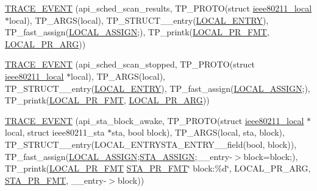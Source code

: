 \begin{DoxyCompactItemize}
\item 
\hyperlink{driver-trace_8h_a092d29134a8ac934242375c8f146a1ba}{T\-R\-A\-C\-E\-\_\-\-E\-V\-E\-N\-T} (api\-\_\-sched\-\_\-scan\-\_\-results, T\-P\-\_\-\-P\-R\-O\-T\-O(struct \hyperlink{structieee80211__local}{ieee80211\-\_\-local} $\ast$local), T\-P\-\_\-\-A\-R\-G\-S(local), T\-P\-\_\-\-S\-T\-R\-U\-C\-T\-\_\-\-\_\-entry(\hyperlink{driver-trace_8h_a70464a6fcf42a8540b6e5b4b5530437f}{L\-O\-C\-A\-L\-\_\-\-E\-N\-T\-R\-Y}), T\-P\-\_\-fast\-\_\-assign(\hyperlink{driver-trace_8h_ab19d9141887ea92ef9640df06a51e0a1}{L\-O\-C\-A\-L\-\_\-\-A\-S\-S\-I\-G\-N};), T\-P\-\_\-printk(\hyperlink{driver-trace_8h_a09833af423135e21ffe99a59ae088cf1}{L\-O\-C\-A\-L\-\_\-\-P\-R\-\_\-\-F\-M\-T}, \hyperlink{driver-trace_8h_aa2a77a17621ecb4f0b3926fec90a5538}{L\-O\-C\-A\-L\-\_\-\-P\-R\-\_\-\-A\-R\-G}))
\item 
\hyperlink{driver-trace_8h_aff2e748442cb64181b77000c86bd652f}{T\-R\-A\-C\-E\-\_\-\-E\-V\-E\-N\-T} (api\-\_\-sched\-\_\-scan\-\_\-stopped, T\-P\-\_\-\-P\-R\-O\-T\-O(struct \hyperlink{structieee80211__local}{ieee80211\-\_\-local} $\ast$local), T\-P\-\_\-\-A\-R\-G\-S(local), T\-P\-\_\-\-S\-T\-R\-U\-C\-T\-\_\-\-\_\-entry(\hyperlink{driver-trace_8h_a70464a6fcf42a8540b6e5b4b5530437f}{L\-O\-C\-A\-L\-\_\-\-E\-N\-T\-R\-Y}), T\-P\-\_\-fast\-\_\-assign(\hyperlink{driver-trace_8h_ab19d9141887ea92ef9640df06a51e0a1}{L\-O\-C\-A\-L\-\_\-\-A\-S\-S\-I\-G\-N};), T\-P\-\_\-printk(\hyperlink{driver-trace_8h_a09833af423135e21ffe99a59ae088cf1}{L\-O\-C\-A\-L\-\_\-\-P\-R\-\_\-\-F\-M\-T}, \hyperlink{driver-trace_8h_aa2a77a17621ecb4f0b3926fec90a5538}{L\-O\-C\-A\-L\-\_\-\-P\-R\-\_\-\-A\-R\-G}))
\item 
\hyperlink{driver-trace_8h_a63770dcb8f073c4d9df3979a925aadfe}{T\-R\-A\-C\-E\-\_\-\-E\-V\-E\-N\-T} (api\-\_\-sta\-\_\-block\-\_\-awake, T\-P\-\_\-\-P\-R\-O\-T\-O(struct \hyperlink{structieee80211__local}{ieee80211\-\_\-local} $\ast$local, struct ieee80211\-\_\-sta $\ast$sta, bool block), T\-P\-\_\-\-A\-R\-G\-S(local, sta, block), T\-P\-\_\-\-S\-T\-R\-U\-C\-T\-\_\-\-\_\-entry(L\-O\-C\-A\-L\-\_\-\-E\-N\-T\-R\-Y\-S\-T\-A\-\_\-\-E\-N\-T\-R\-Y\-\_\-\-\_\-field(bool, block)), T\-P\-\_\-fast\-\_\-assign(\hyperlink{driver-trace_8h_ab19d9141887ea92ef9640df06a51e0a1}{L\-O\-C\-A\-L\-\_\-\-A\-S\-S\-I\-G\-N};\hyperlink{driver-trace_8h_abbd837b5fc444c0cb48b5954f8ad068a}{S\-T\-A\-\_\-\-A\-S\-S\-I\-G\-N};\-\_\-\-\_\-entry-\/$>$block=block;), T\-P\-\_\-printk(\hyperlink{driver-trace_8h_a09833af423135e21ffe99a59ae088cf1}{L\-O\-C\-A\-L\-\_\-\-P\-R\-\_\-\-F\-M\-T} \hyperlink{driver-trace_8h_a73d0cd445b999888e3f21698b769c843}{S\-T\-A\-\_\-\-P\-R\-\_\-\-F\-M\-T}\char`\"{} block\-:\%d\char`\"{}, L\-O\-C\-A\-L\-\_\-\-P\-R\-\_\-\-A\-R\-G, \hyperlink{driver-trace_8h_a73d0cd445b999888e3f21698b769c843}{S\-T\-A\-\_\-\-P\-R\-\_\-\-F\-M\-T}, \-\_\-\-\_\-entry-\/$>$block))

\end{DoxyCompactItemize}
